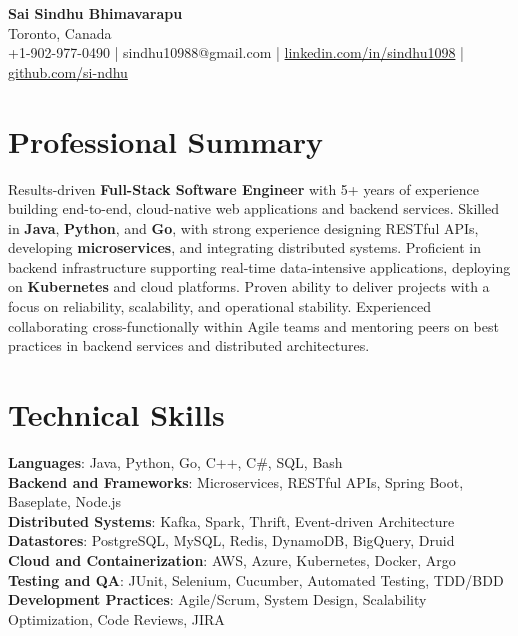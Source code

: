 \documentclass[letterpaper,11pt]{article}
\begin{document}
\begin{center}
  {\Large \textbf{Sai Sindhu Bhimavarapu}} \\
  Toronto, Canada \\
  +1-902-977-0490 \enspace | \enspace sindhu10988@gmail.com \enspace | \enspace \href{https://www.linkedin.com/in/sindhu1098/}{linkedin.com/in/sindhu1098} \enspace | \enspace \href{https://github.com/si-ndhu}{github.com/si-ndhu}
\end{center}

\section{Professional Summary}
  \begin{itemize}[leftmargin=0.15in, label={}]
    \small{\item{
     Results-driven \textbf{Full-Stack Software Engineer} with 5+ years of experience building end-to-end, cloud-native web applications and backend services. Skilled in \textbf{Java}, \textbf{Python}, and \textbf{Go}, with strong experience designing RESTful APIs, developing \textbf{microservices}, and integrating distributed systems. Proficient in backend infrastructure supporting real-time data-intensive applications, deploying on \textbf{Kubernetes} and cloud platforms. Proven ability to deliver projects with a focus on reliability, scalability, and operational stability. Experienced collaborating cross-functionally within Agile teams and mentoring peers on best practices in backend services and distributed architectures.
    }}
  \end{itemize}
\vspace{-16pt}

\section{Technical Skills}
 \begin{itemize}[leftmargin=0.15in, label={}]
    \small{\item{
     \textbf{Languages}: Java, Python, Go, C++, C\#, SQL, Bash \\
     \textbf{Backend and Frameworks}: Microservices, RESTful APIs, Spring Boot, Baseplate, Node.js \\
     \textbf{Distributed Systems}: Kafka, Spark, Thrift, Event-driven Architecture \\
     \textbf{Datastores}: PostgreSQL, MySQL, Redis, DynamoDB, BigQuery, Druid \\
     \textbf{Cloud and Containerization}: AWS, Azure, Kubernetes, Docker, Argo \\
     \textbf{Testing and QA}: JUnit, Selenium, Cucumber, Automated Testing, TDD/BDD \\
     \textbf{Development Practices}: Agile/Scrum, System Design, Scalability Optimization, Code Reviews, JIRA
    }}
 \end{itemize}
\vspace{-16pt}
\end{document}
